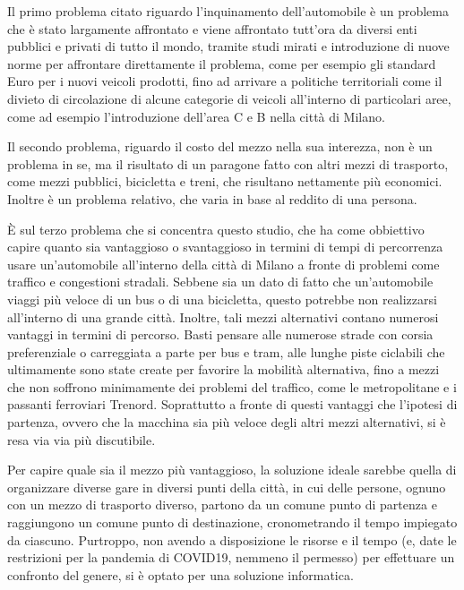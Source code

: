 Il primo problema citato riguardo l'inquinamento dell'automobile è un problema che è stato largamente affrontato e viene affrontato tutt'ora da diversi enti pubblici e privati di tutto il mondo, tramite studi mirati e introduzione di nuove norme per affrontare direttamente il problema, come per esempio gli standard Euro per i nuovi veicoli prodotti, fino ad arrivare a politiche territoriali come il divieto di circolazione di alcune categorie di veicoli all'interno di particolari aree, come ad esempio l'introduzione dell'area C e B nella città di Milano.

Il secondo problema, riguardo il costo del mezzo nella sua interezza, non è un problema in se, ma il risultato di un paragone fatto con altri mezzi di trasporto, come mezzi pubblici, bicicletta e treni, che risultano nettamente più economici. Inoltre è un problema relativo, che varia in base al reddito di una persona.

È sul terzo problema che si concentra questo studio, che ha come obbiettivo capire quanto sia vantaggioso o svantaggioso in termini di tempi di percorrenza usare un'automobile all'interno della città di Milano a fronte di problemi come traffico e congestioni stradali.
Sebbene sia un dato di fatto che un'automobile viaggi più veloce di un bus o di una bicicletta, questo potrebbe non realizzarsi all'interno di una grande città. Inoltre, tali mezzi alternativi contano numerosi vantaggi in termini di percorso. Basti pensare alle numerose strade con corsia preferenziale o carreggiata a parte per bus e tram, alle lunghe piste ciclabili che ultimamente sono state create per favorire la mobilità alternativa, fino a mezzi che non soffrono minimamente dei problemi del traffico, come le metropolitane e i passanti ferroviari Trenord. Soprattutto a fronte di questi vantaggi che l'ipotesi di partenza, ovvero che la macchina sia più veloce degli altri mezzi alternativi, si è resa via via più discutibile.

Per capire quale sia il mezzo più vantaggioso, la soluzione ideale sarebbe quella di organizzare diverse gare in diversi punti della città, in cui delle persone, ognuno con un mezzo di trasporto diverso, partono da un comune punto di partenza e raggiungono un comune punto di destinazione, cronometrando il tempo impiegato da ciascuno. Purtroppo, non avendo a disposizione le risorse e il tempo (e, date le restrizioni per la pandemia di COVID19, nemmeno il permesso) per effettuare un confronto del genere, si è optato per una soluzione informatica.